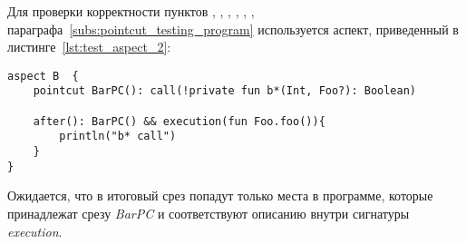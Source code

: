  Для проверки корректности пунктов
 \quotes{\ref{list:method_name_check}},
 \quotes{\ref{list:class_name_check}},
 \quotes{\ref{list:method_modifiers_check}},
 \quotes{\ref{list:method_return_value_check}},
 \quotes{\ref{list:execution_check}},
 \quotes{\ref{list:reference_pointcut_check}},
 \quotes{\ref{list:logic_operations_check}} параграфа~\ref{subs:pointcut_testing_program} используется аспект, приведенный в листинге~\ref{lst:test_aspect_2}:
\begin{lstlisting}[style={java}, label={lst:test_aspect_2},
  caption={Пример тестового аспекта}]
aspect B  {
    pointcut BarPC(): call(!private fun b*(Int, Foo?): Boolean)

    after(): BarPC() && execution(fun Foo.foo()){
        println("b* call")
    }
}
\end{lstlisting}

Ожидается, что в итоговый срез попадут только места в программе, которые принадлежат срезу \textit{BarPC} и соответствуют описанию внутри сигнатуры \textit{execution}.

